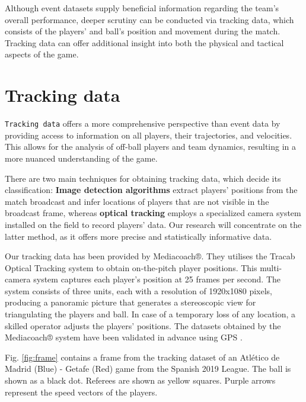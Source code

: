 \documentclass[
  10pt,
  twoside,nohyper]{book}
\begin{document}
Although event datasets supply beneficial information regarding the team's overall performance, deeper scrutiny can be conducted via tracking data, which consists of the players' and ball's position and movement during the match. Tracking data can offer additional insight into both the physical and tactical aspects of the game.

\section{Tracking data}\label{tracking-data}

\texttt{Tracking\ data} offers a more comprehensive perspective than event data by providing access to information on all players, their trajectories, and velocities. This allows for the analysis of off-ball players and team dynamics, resulting in a more nuanced understanding of the game.

There are two main techniques for obtaining tracking data, which decide its classification: \textbf{Image detection algorithms} extract players' positions from the match broadcast and infer locations of players that are not visible in the broadcast frame, whereas \textbf{optical tracking} employs a specialized camera system installed on the field to record players' data. Our research will concentrate on the latter method, as it offers more precise and statistically informative data.

Our tracking data has been provided by Mediacoach®. They utilises the Tracab Optical Tracking system to obtain on-the-pitch player positions. This multi-camera system captures each player's position at 25 frames per second. The system consists of three units, each with a resolution of 1920x1080 pixels, producing a panoramic picture that generates a stereoscopic view for triangulating the players and ball. In case of a temporary loss of any location, a skilled operator adjusts the players' positions. The datasets obtained by the Mediacoach® system have been validated in advance using GPS \citep{Felipe2019ValidationOA}.

Fig. \ref{fig:frame} contains a frame from the tracking dataset of an Atlético de Madrid (Blue) - Getafe (Red) game from the Spanish 2019 League. The ball is shown as a black dot. Referees are shown as yellow squares. Purple arrows represent the speed vectors of the players.
\end{document}
